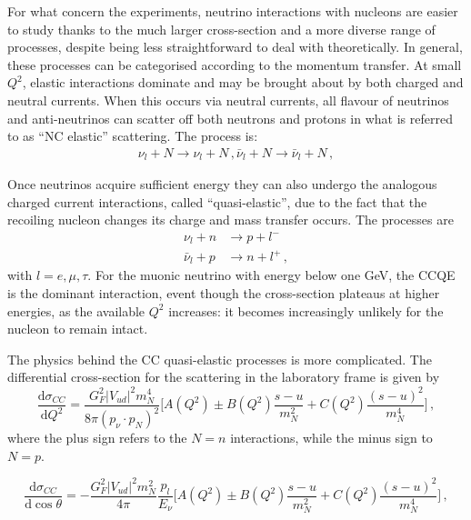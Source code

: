 For what concern the experiments, neutrino interactions with nucleons are easier to study thanks to the %
much larger cross-section and a more diverse range of processes, despite being less straightforward to %
deal with theoretically.
In general, these processes can be categorised according to the momentum transfer.
At small $Q^2$, elastic interactions dominate and may be brought about by both charged and neutral currents.
When this occurs via neutral currents, all flavour of neutrinos and anti-neutrinos can scatter off %
both neutrons and protons in what is referred to as ``NC elastic'' scattering.
The process is:
\begin{align}
	\nu_l + N \rightarrow \nu_l + N\,,
	\bar\nu_l + N \rightarrow \bar\nu_l + N\,,
\end{align}

Once neutrinos acquire sufficient energy they can also undergo the analogous charged current interactions, %
called ``quasi-elastic'', due to the fact that the recoiling nucleon changes its charge and mass transfer occurs.
The processes are
\begin{align}
	\nu_l + n &\rightarrow p + l^-\,\\
	\bar\nu_l + p &\rightarrow n + l^+\,,
\end{align}
with $l=e, \mu, \tau$.
For the muonic neutrino with energy below one GeV, the CCQE is the dominant interaction, event though the %
cross-section plateaus at higher energies, as the available $Q^2$ increases: it becomes increasingly unlikely %
for the nucleon to remain intact.

The physics behind the CC quasi-elastic processes is more complicated.
The differential cross-section for the scattering in the laboratory frame is given by
\begin{equation}
	\label{eq:cc_xsec_q}
	\frac{\mathrm{d} \sigma_{CC}}{\mathrm{d}Q^2} = \frac{G_F^2 |V_{ud}|^2 m_N^4}{8\pi (p_\nu \cdot p_N)^2} %
	\bigg [A(Q^2) \pm B(Q^2) \frac{s-u}{m_N^2} + C(Q^2) \frac{(s-u)^2}{m_N^4} \bigg]\,,
\end{equation}
where the plus sign refers to the $N = n$ interactions, while the minus sign to $N = p$.

\begin{equation}
	\label{eq:cc_xsec_t}
	\frac{\mathrm{d} \sigma_{CC}}{\mathrm{d}\cos\theta} = -\frac{G_F^2 |V_{ud}|^2 m_N^2}{4\pi} \frac{p_l}{E_\nu} %
	\bigg [A(Q^2) \pm B(Q^2) \frac{s-u}{m_N^2} + C(Q^2) \frac{(s-u)^2}{m_N^4} \bigg]\,,
\end{equation}

